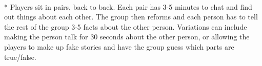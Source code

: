 \begin{minipage}{\textwidth}
\equip{}
\\*
Players sit in pairs, back to back.  Each pair has 3-5 minutes to chat and find out things about each other.  The group then reforms and each person has to tell the rest of the group 3-5 facts about the other person.  Variations can include making the person talk for 30 seconds about the other person, or allowing the players to make up fake stories and have the group guess which parts are true/false.
\end{minipage}    \vfill
